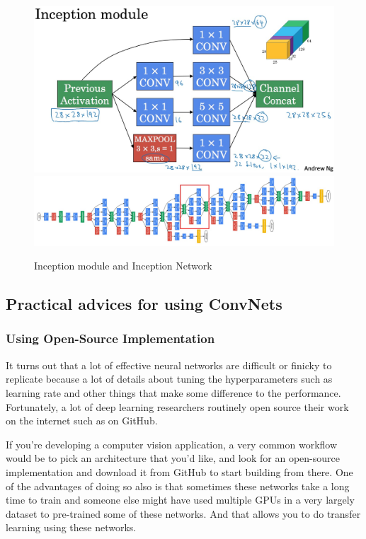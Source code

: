 \documentclass[UTF8]{article}
\begin{document}
\begin{figure}[htb]
    \centering
    \includegraphics[width=35em]{figures/inception-module}
    \includegraphics[width=40em]{figures/inception-network}
    \caption{Inception module and Inception Network}
    \label{fig:inception-module-and-inception-network}
\end{figure}

\subsection{Practical advices for using ConvNets}
\subsubsection{Using Open-Source Implementation}
It turns out that a lot of effective neural networks are difficult or finicky to replicate because
a lot of details about tuning the hyperparameters such as learning rate and other things that make
some difference to the performance. Fortunately, a lot of deep learning researchers routinely open
source their work on the internet such as on GitHub.

If you're developing a computer vision application, a very common workflow would be to pick an
architecture that you'd like, and look for an open-source implementation and download it from
GitHub to start building from there. One of the advantages of doing so also is that sometimes these
networks take a long time to train and someone else might have used multiple GPUs in a very largely
dataset to pre-trained some of these networks. And that allows you to do transfer learning using
these networks.
\end{document}
